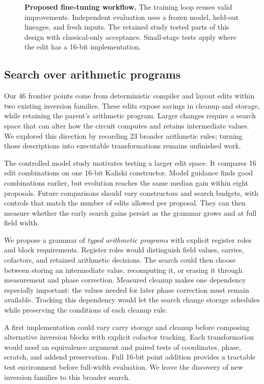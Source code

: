 \documentclass[aps,prx,reprint,raggedbottom,superscriptaddress,longbibliography,floatfix]{revtex4-2}
\begin{document}
\begin{figure}[!tp]
\centering
\resizebox{\textwidth}{!}{}
\caption{\textbf{Proposed fine-tuning workflow.}
The training loop reuses valid improvements.
Independent evaluation uses a frozen model, held-out lineages, and fresh inputs.
The retained study tested parts of this design with classical-only acceptance.
Small-stage tests apply where the edit has a 16-bit implementation.}
\label{fig:finetuning}
\end{figure}

\subsection{Search over arithmetic programs}
Our 46 frontier points come from deterministic compiler and layout edits within two existing inversion families.
These edits expose savings in cleanup and storage, while retaining the parent's arithmetic program.
Larger changes require a search space that can alter how the circuit computes and retains intermediate values.
We explored this direction by recording 23 broader arithmetic rules; turning those descriptions into executable transformations remains unfinished work.

The controlled model study motivates testing a larger edit space.
It compares 16 edit combinations on one 16-bit Kaliski constructor.
Model guidance finds good combinations earlier, but evolution reaches the same median gain within eight proposals.
Future comparisons should vary constructors and search budgets, with controls that match the number of edits allowed per proposal.
They can then measure whether the early search gains persist as the grammar grows and at full field width.

We propose a grammar of \emph{typed arithmetic programs} with explicit register roles and block requirements.
Register roles would distinguish field values, carries, cofactors, and retained arithmetic decisions.
The search could then choose between storing an intermediate value, recomputing it, or erasing it through measurement and phase correction.
Measured cleanup makes one dependency especially important: the values needed for later phase correction must remain available.
Tracking this dependency would let the search change storage schedules while preserving the conditions of each cleanup rule.

A first implementation could vary carry storage and cleanup before composing alternative inversion blocks with explicit cofactor tracking.
Each transformation would need an equivalence argument and paired tests of coordinates, phase, scratch, and addend preservation.
Full 16-bit point addition provides a tractable test environment before full-width evaluation.
We leave the discovery of new inversion families to this broader search.
\end{document}
